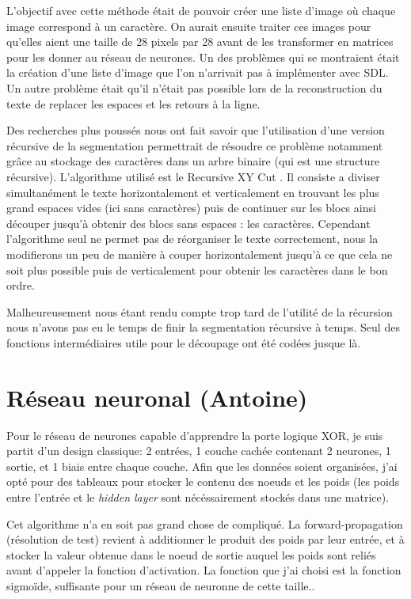 \documentclass[12pt]{report}
\begin{document}
\newpage
L'objectif avec cette méthode était de pouvoir créer une liste d'image où chaque image correspond à un caractère. On aurait ensuite traiter ces images pour qu'elles aient une taille de 28 pixels par 28 avant de les transformer en matrices pour les donner au réseau de neurones. Un des problèmes qui se montraient était la création d'une liste d'image que l'on n'arrivait pas à implémenter avec SDL. Un autre problème était qu'il n'était pas possible lors de la reconstruction du texte de replacer les espaces et les retours à la ligne.

Des recherches plus poussés nous ont fait savoir que l'utilisation d'une version récursive de la segmentation permettrait de résoudre ce problème notamment grâce au stockage des caractères dans un arbre binaire (qui est une structure récursive). L'algorithme utilisé est le Recursive XY Cut . Il consiste a diviser simultanément le texte horizontalement et verticalement en trouvant les plus grand espaces vides (ici sans caractères) puis de continuer sur les blocs ainsi découper jusqu'à obtenir des blocs sans espaces : les caractères. Cependant l'algorithme seul ne permet pas de réorganiser le texte correctement, nous la modifierons un peu de manière à couper horizontalement jusqu'à ce que cela ne soit plus possible puis de verticalement pour obtenir les caractères dans le bon ordre.

Malheureusement nous étant rendu compte trop tard de l'utilité de la récursion nous n'avons pas eu le temps de finir la segmentation récursive à temps. Seul des fonctions intermédiaires utile pour le découpage ont été codées jusque là.

\newpage
\section{Réseau neuronal (Antoine)}

Pour le réseau de neurones capable d'apprendre la porte logique XOR, je suis partit d'un design classique: 2 entrées, 1 couche cachée contenant 2 neurones, 1 sortie, et 1 biais entre chaque couche. Afin que les données soient organisées, j'ai opté pour des tableaux pour stocker le contenu des noeuds et les poids (les poids entre l'entrée et le \textit{hidden layer} sont nécéssairement stockés dans une matrice). 

Cet algorithme n'a en soit pas grand chose de compliqué. La forward-propagation (résolution de test) revient à additionner le produit des poids par leur entrée, et à stocker la valeur obtenue dans le noeud de sortie auquel les poids sont reliés avant d'appeler la fonction d'activation. La fonction que j'ai choisi est la fonction sigmoïde, suffisante pour un réseau de neuronne de cette taille..
\end{document}
